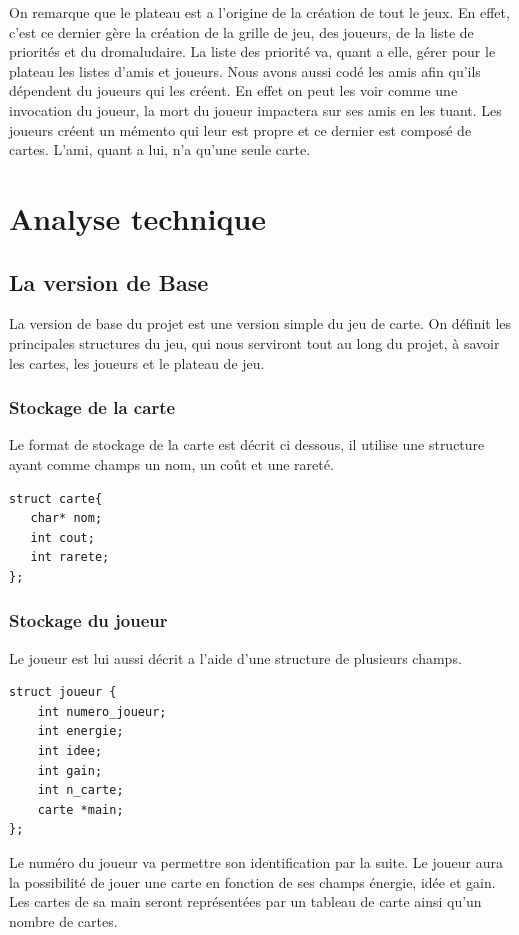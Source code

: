 \documentclass[10pt,a4paper]{article}
\begin{document}
On remarque que le plateau est a l'origine de la création de tout le jeux. En effet, c'est ce dernier gère la création de la grille de jeu, des joueurs, de la liste de priorités et du dromaludaire.
La liste des priorité va, quant a elle, gérer pour le plateau les listes d'amis et joueurs.
Nous avons aussi codé les amis afin qu'ils dépendent du joueurs qui les créent. En effet on peut les voir comme une invocation du joueur, la mort du joueur impactera sur ses amis en les tuant.
Les joueurs créent un mémento qui leur est propre et ce dernier est composé de cartes. L'ami, quant a lui, n'a qu'une seule carte.


\newpage
\section{Analyse technique}
\subsection{La version de Base}
La version de base du projet est une version simple du jeu de carte. On définit les principales structures du jeu, qui nous serviront tout au long du projet, à savoir les cartes, les joueurs et le plateau de jeu. 

\subsubsection{Stockage de la carte}
Le format de stockage de la carte est décrit ci dessous, il utilise une structure ayant comme champs un nom, un coût et une rareté.


\begin{verbatim}
struct carte{
   char* nom; 	
   int cout;
   int rarete;
};
\end{verbatim}

\subsubsection{Stockage du joueur}
Le joueur est lui aussi décrit a l'aide d'une structure de plusieurs champs.

\begin{verbatim}
struct joueur {
    int numero_joueur;
    int energie;
    int idee;
    int gain;
    int n_carte;
    carte *main;
};
\end{verbatim}

Le numéro du joueur va permettre son identification par la suite. Le joueur aura la possibilité de jouer une carte en fonction de ses champs énergie, idée et gain. Les cartes de sa main seront représentées par un tableau de carte ainsi qu'un nombre de cartes. 
\end{document}
